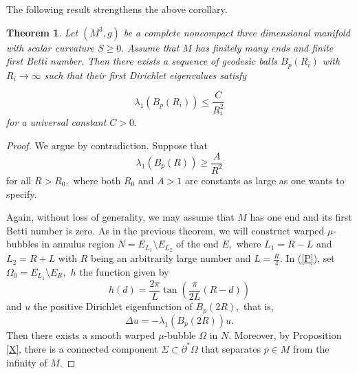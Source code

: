 \documentclass{amsart}
\newtheorem{theorem}{Theorem}[section]
\numberwithin{equation}{section}
\begin{document}
The following result strengthens the above corollary.

\begin{theorem}
Let $\left( M^{3},g\right) $ be a complete noncompact three dimensional manifold with
scalar curvature $S\geq 0.$ Assume that $M$ has finitely many ends and
finite first Betti number. Then there exists a sequence of geodesic balls $B_p(R_i)$ with
$R_{i}\rightarrow \infty $ such that their first Dirichlet eigenvalues satisfy
 
\begin{equation*}
\lambda _{1}\left( B_{p}\left( R_{i}\right) \right) \leq \frac{C}{R_{i}^{2}}
\end{equation*}%
for a universal constant $C>0.$
\end{theorem}

\begin{proof}
We argue by contradiction. Suppose that
\begin{equation}
\lambda _{1}\left( B_{p}\left( R\right) \right) \geq \frac{A}{R^{2}}
\label{m1}
\end{equation}
for all $R>R_{0},$ where both $R_0$ and $A>1$ are constants as large as one wants to specify.

Again, without loss of generality, we may assume that $M$ has one end and its first
Betti number is zero. As in the previous theorem, 
we will construct warped
$\mu$-bubbles in annulus region $N=E_{L_1}\setminus E_{L_2}$ of the end $E,$
where $L_1=R-L$ and $L_2=R+L$ with $R$ being an arbitrarily large number and $L=\frac{R}{4}.$ 
In (\ref{P}), set $\Omega_0=E_{L_1}\setminus E_{R},$ $h$ the function given by
\begin{equation*}
h\left( d\right) =\frac{2\pi }{L}\tan \left( \frac{\pi }{2L}(R-d)\right)
\end{equation*} 
and $u$ the positive Dirichlet eigenfunction of $B_{p}\left(2R\right),$ that is,
\begin{equation*}
\Delta u=-\lambda _{1}\left( B_{p}\left( 2R\right) \right) u.
\end{equation*}
Then there exists a smooth warped $\mu$-bubble $\Omega$ in $N.$ Moreover, by Proposition \ref{X},
there is a connected component $\Sigma \subset \partial ^{\ast }\Omega $
that separates $p\in M$ from the infinity of $M.$


\end{proof}
\end{document}
